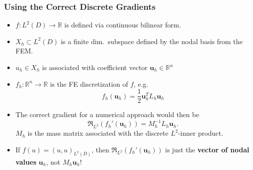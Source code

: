 \documentclass[aspectratio=169,xcolor=dvipsnames,10pt]{beamer}
\begin{document}
\begin{frame}\frametitle{Using the Correct Discrete Gradients}
\vspace{-2ex}
\begin{example}[]
\begin{itemize}
\item
$f : L^2(D) \to \mathbb R$  is defined via continuous bilinear form.
\item 
$X_h \subset L^2(D)$ is a finite dim.\ subspace defined by the nodal basis from the FEM. 
\item 
$u_h \in X_h$ is associated with coefficient vector $\mathbf{u}_h \in \mathbb R^n$ \pause
\item 
$f_h : \mathbb R^n \to \mathbb R$ is the FE discretization of $f$, e.g.
\[
f_h(\mathbf{u}_h) = \frac{1}{2} \mathbf{u}^T_h L_h \mathbf{u}_h
\]
\item The correct gradient for a numerical approach would then be
\[
\mathfrak{R}_{L^2}(f_h'(\mathbf{u}_h)) = M_h^{-1} L_h \mathbf{u}_h.
\]
$M_h$ is the mass matrix associated with the discrete $L^2$-inner product.
\item If $f(u) = (u,u)_{L^2(D)}$, then $\mathfrak{R}_{L^2}(f_h'(\mathbf{u}_h))$ is just the \textbf{vector of nodal values} $\bm u_h$, \alert{not} $M_h \bm u_h$!
\end{itemize}
\end{example}
\end{frame}

\end{document}
